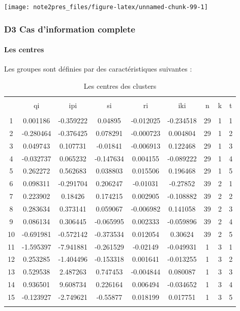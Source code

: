 \documentclass[11pt,]{article}
\let\oldparagraph\paragraph
\renewcommand{\paragraph}[1]{\oldparagraph{#1}\mbox{}}
\begin{document}
\begin{center}\texttt{[image: note2pres\_files/figure-latex/unnamed-chunk-99-1]} \end{center}

\hypertarget{d3-cas-dinformation-complete}{%
\subsubsection{D3 Cas d'information
complete}\label{d3-cas-dinformation-complete}}

\hypertarget{les-centres-1}{%
\paragraph{Les centres}\label{les-centres-1}}

Les groupes sont définies par des caractéristiques suivantes :

\FloatBarrier

\begin{table}[!htbp] \centering 
  \caption{Les centres des clusters} 
  \label{} 
\begin{tabular}{@{\extracolsep{5pt}} ccccccccc} 
\\[-1.8ex]\hline 
\hline \\[-1.8ex] 
 & qi & ipi & si & ri & iki & n & k & t \\ 
\hline \\[-1.8ex] 
1 & 0.001186 & -0.359222 & 0.04895 & -0.012025 & -0.234518 & 29 & 1 & 1 \\ 
2 & -0.280464 & -0.376425 & 0.078291 & -0.000723 & 0.004804 & 29 & 1 & 2 \\ 
3 & 0.049743 & 0.107731 & -0.01841 & -0.006913 & 0.122468 & 29 & 1 & 3 \\ 
4 & -0.032737 & 0.065232 & -0.147634 & 0.004155 & -0.089222 & 29 & 1 & 4 \\ 
5 & 0.262272 & 0.562683 & 0.038803 & 0.015506 & 0.196468 & 29 & 1 & 5 \\ 
6 & 0.098311 & -0.291704 & 0.206247 & -0.01031 & -0.27852 & 39 & 2 & 1 \\ 
7 & 0.223902 & 0.18426 & 0.174215 & 0.002905 & -0.108882 & 39 & 2 & 2 \\ 
8 & 0.283634 & 0.373141 & 0.059067 & -0.006982 & 0.141058 & 39 & 2 & 3 \\ 
9 & 0.086134 & 0.306445 & -0.065995 & 0.002333 & -0.059896 & 39 & 2 & 4 \\ 
10 & -0.691981 & -0.572142 & -0.373534 & 0.012054 & 0.30624 & 39 & 2 & 5 \\ 
11 & -1.595397 & -7.941881 & -0.261529 & -0.02149 & -0.049931 & 1 & 3 & 1 \\ 
12 & 0.253285 & -1.404496 & -0.153318 & 0.001641 & -0.013255 & 1 & 3 & 2 \\ 
13 & 0.529538 & 2.487263 & 0.747453 & -0.004844 & 0.080087 & 1 & 3 & 3 \\ 
14 & 0.936501 & 9.608734 & 0.226164 & 0.006494 & -0.034652 & 1 & 3 & 4 \\ 
15 & -0.123927 & -2.749621 & -0.55877 & 0.018199 & 0.017751 & 1 & 3 & 5 \\ 
\hline \\[-1.8ex] 
\end{tabular} 
\end{table}
\end{document}
